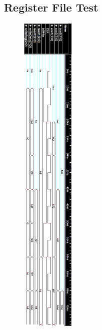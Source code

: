 \documentclass{article}
\begin{document}
    \subsection{Register File Test}
    \vspace{-10mm}
    \begin{figure}[H]
      \includegraphics[width=0.224\textwidth, right]{RegTest.png}
    \end{figure}
    \newpage
\end{document}
